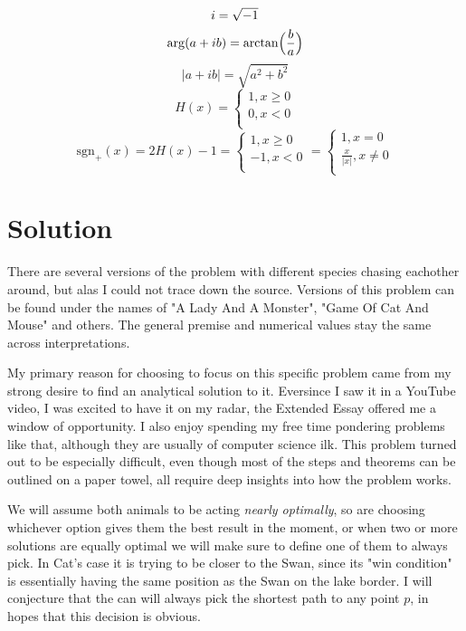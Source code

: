 \documentclass[12pt]{article}
\begin{document}
\begin{multicols*}{2}
	$$i = \sqrtsign{-1}$$
	$$\arg (a + i b) = \arctan \Bigl(\frac{b}{a}\Bigr)$$
	$$|a + ib| = \sqrt{a^2  + b^2}$$
	\begin{equation*}
		H(x) = \left\{ \begin{aligned} 
				1, x \geq 0\\
				0, x < 0\\
				\end{aligned} \right.
	\end{equation*}
	\begin{equation*}
		\text{sgn}_+(x) = 2H(x) - 1 = \left\{ \begin{aligned} 
			1, x \geq 0 \\
			-1,x < 0 \\
			\end{aligned} \right. = \left\{ \begin{aligned} 
				1, x = 0 \\
				\frac{x}{|x|}, x \neq 0 \\
				\end{aligned} \right.
	\end{equation*}
\end{multicols*}

\section{Solution}
There are several versions of the problem with different species chasing eachother around, but alas I could not trace down the source. Versions of this problem can be found under the names of "A Lady And A Monster"\cite{ladyandmonster}, "Game Of Cat And Mouse"\cite{Catandmouse} and others. The general premise and numerical values stay the same across interpretations. 

My primary reason for choosing to focus on this specific problem came from my strong desire to find an analytical solution to it. Eversince I saw it in a YouTube video\cite{Catandmouse}, I was excited to have it on my radar, the Extended Essay offered me a window of opportunity. I also enjoy spending my free time pondering problems like that, although they are usually of computer science ilk. This problem turned out to be especially difficult, even though most of the steps and theorems can be outlined on a paper towel, all require deep insights into how the problem works.

We will assume both animals to be acting \textit{nearly optimally}, so are choosing whichever option gives them the best result in the moment, or when two or more solutions are equally optimal we will make sure to define one of them to always pick. In Cat's case it is trying to be closer to the Swan, since its "win condition" is essentially having the same position as the Swan on the lake border. I will conjecture that the can will always pick the shortest path to any point $p$, in hopes that this decision is obvious.
\end{document}
